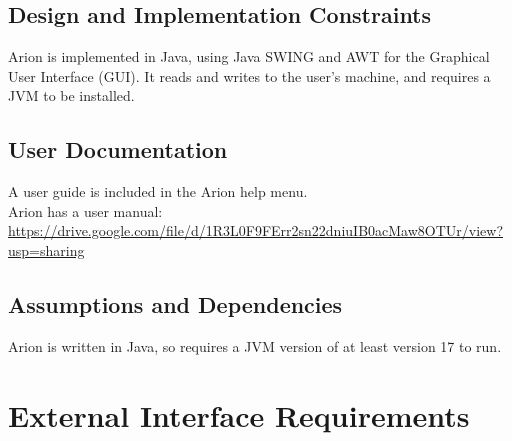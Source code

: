 \documentclass{scrreprt}
\begin{document}
\section{Design and Implementation Constraints}
Arion is implemented in Java, using Java SWING and AWT for the Graphical User Interface (GUI).
It reads and writes to the user’s machine, and requires a JVM to be installed.

\section{User Documentation}
\begin{flushleft}
    A user guide is included in the Arion help menu. \\
    Arion has a user manual: \\
    \url{https://drive.google.com/file/d/1R3L0F9FErr2sn22dniuIB0acMaw8OTUr/view?usp=sharing}
\end{flushleft}

\section{Assumptions and Dependencies}
Arion is written in Java, so requires a JVM version of at least version 17 to run.


\chapter{External Interface Requirements}
\end{document}

